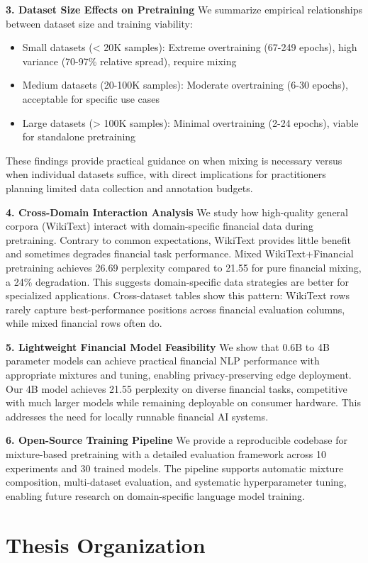\textbf{3. Dataset Size Effects on Pretraining}
We summarize empirical relationships between dataset size and training viability:
\begin{itemize}
    \item Small datasets (< 20K samples): Extreme overtraining (67-249 epochs), high variance (70-97\% relative spread), require mixing
    \item Medium datasets (20-100K samples): Moderate overtraining (6-30 epochs), acceptable for specific use cases
    \item Large datasets (> 100K samples): Minimal overtraining (2-24 epochs), viable for standalone pretraining
\end{itemize}
These findings provide practical guidance on when mixing is necessary versus when individual datasets suffice, with direct implications for practitioners planning limited data collection and annotation budgets.

\textbf{4. Cross-Domain Interaction Analysis}
We study how high-quality general corpora (WikiText) interact with domain-specific financial data during pretraining. Contrary to common expectations, WikiText provides little benefit and sometimes degrades financial task performance. Mixed WikiText+Financial pretraining achieves 26.69 perplexity compared to 21.55 for pure financial mixing, a 24\% degradation. This suggests domain-specific data strategies are better for specialized applications. Cross-dataset tables show this pattern: WikiText rows rarely capture best-performance positions across financial evaluation columns, while mixed financial rows often do.

\textbf{5. Lightweight Financial Model Feasibility}
We show that 0.6B to 4B parameter models can achieve practical financial NLP performance with appropriate mixtures and tuning, enabling privacy-preserving edge deployment. Our 4B model achieves 21.55 perplexity on diverse financial tasks, competitive with much larger models while remaining deployable on consumer hardware. This addresses the need for locally runnable financial AI systems.

\textbf{6. Open-Source Training Pipeline}
We provide a reproducible codebase for mixture-based pretraining with a detailed evaluation framework across 10 experiments and 30 trained models. The pipeline supports automatic mixture composition, multi-dataset evaluation, and systematic hyperparameter tuning, enabling future research on domain-specific language model training.

\section{Thesis Organization}

